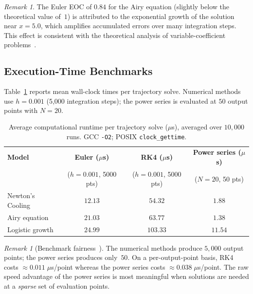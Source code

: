 \documentclass[12pt,a4paper]{article}
\theoremstyle{definition}
\theoremstyle{remark}
\newtheorem{remark}[theorem]{Remark}
\begin{document}
\begin{remark}
  The Euler EOC of $0.84$ for the Airy equation (slightly below the
  theoretical value of~$1$) is attributed to the exponential growth
  of the solution near $x = 5.0$, which amplifies accumulated errors
  over many integration steps.  This effect is consistent with the
  theoretical analysis of variable-coefficient
  problems~\cite{hairer1993}.
\end{remark}

\subsection{Execution-Time Benchmarks}

Table~\ref{tab:timing} reports mean wall-clock times per trajectory
solve.  Numerical methods use $h = 0.001$ (5{,}000 integration
steps); the power series is evaluated at $50$ output points with
$N = 20$.

\begin{table}[H]
  \centering
  \caption{Average computational runtime per trajectory solve
    ($\mu$s), averaged over $10{,}000$ runs.
    GCC \texttt{-O2}; POSIX \texttt{clock\_gettime}.}
  \label{tab:timing}
  \renewcommand{\arraystretch}{1.15}
  \begin{tabular}{@{}lccc@{}}
    \toprule
    \textbf{Model}
      & \textbf{Euler ($\mu$s)} & \textbf{RK4 ($\mu$s)}
      & \textbf{Power series ($\mu$s)}\\
      & ($h=0.001$, 5000 pts)   & ($h=0.001$, 5000 pts)
      & ($N=20$, 50 pts)\\
    \midrule
    Newton's Cooling & $12.13$ & $54.32$ & $1.88$ \\
    Airy equation    & $21.03$ & $63.77$ & $1.38$ \\
    Logistic growth  & $24.99$ & $103.33$ & $11.54$ \\
    \bottomrule
  \end{tabular}
\end{table}

\begin{remark}[Benchmark fairness~{\cite{barrio2005}}]
  \label{rem:fair}
  The numerical methods produce $5{,}000$ output points; the power
  series produces only~$50$.  On a per-output-point basis, RK4 costs
  $\approx 0.011\;\mu$s/point whereas the power series costs
  $\approx 0.038\;\mu$s/point.  The raw speed advantage of the power
  series is most meaningful when solutions are needed at a \emph{sparse}
  set of evaluation points.
\end{remark}
\end{document}
